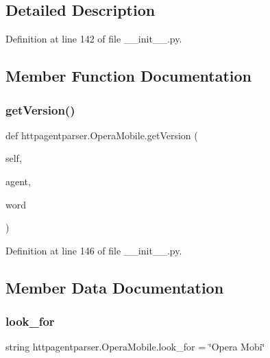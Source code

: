\subsection{Detailed Description}


Definition at line 142 of file \+\_\+\+\_\+init\+\_\+\+\_\+.\+py.



\subsection{Member Function Documentation}
\hypertarget{classhttpagentparser_1_1_opera_mobile_af8c3ca76ea902b29043486473144fd18}{}\label{classhttpagentparser_1_1_opera_mobile_af8c3ca76ea902b29043486473144fd18} 
\subsubsection{\texorpdfstring{get\+Version()}{getVersion()}}
{\footnotesize\ttfamily def httpagentparser.\+Opera\+Mobile.\+get\+Version (\begin{DoxyParamCaption}\item[{}]{self,  }\item[{}]{agent,  }\item[{}]{word }\end{DoxyParamCaption})}



Definition at line 146 of file \+\_\+\+\_\+init\+\_\+\+\_\+.\+py.



\subsection{Member Data Documentation}
\hypertarget{classhttpagentparser_1_1_opera_mobile_ae2403fee29098da6edf99f96614542b2}{}\label{classhttpagentparser_1_1_opera_mobile_ae2403fee29098da6edf99f96614542b2} 
\subsubsection{\texorpdfstring{look\+\_\+for}{look\_for}}
{\footnotesize\ttfamily string httpagentparser.\+Opera\+Mobile.\+look\+\_\+for = \char`\"{}Opera Mobi\char`\"{}\hspace{0.3cm}{\ttfamily [static]}}



